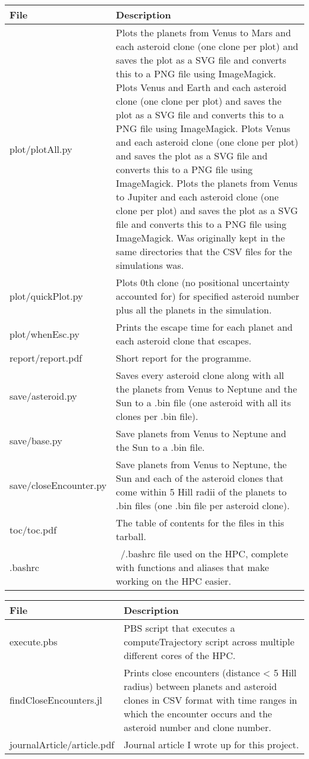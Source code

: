 \documentclass[12pt,a4paper]{article}
\begin{document}
\begin{tabular}{|m{15em}|m{30em}|}
    \hline
    File & Description \\\hline
    plot/plotAll.py & Plots the planets from Venus to Mars and each asteroid clone (one clone per plot) and saves the plot as a SVG file and converts this to a PNG file using ImageMagick. Plots Venus and Earth and each asteroid clone (one clone per plot) and saves the plot as a SVG file and converts this to a PNG file using ImageMagick. Plots Venus and each asteroid clone (one clone per plot) and saves the plot as a SVG file and converts this to a PNG file using ImageMagick. Plots the planets from Venus to Jupiter and each asteroid clone (one clone per plot) and saves the plot as a SVG file and converts this to a PNG file using ImageMagick. Was originally kept in the same directories that the CSV files for the simulations was.\\\hline
    plot/quickPlot.py & Plots 0th clone (no positional uncertainty accounted for) for specified asteroid number plus all the planets in the simulation.\\\hline
    plot/whenEsc.py & Prints the escape time for each planet and each asteroid clone that escapes. \\\hline
    report/report.pdf & Short report for the programme. \\\hline
    save/asteroid.py & Saves every asteroid clone along with all the planets from Venus to Neptune and the Sun to a .bin file (one asteroid with all its clones per .bin file). \\\hline
    save/base.py & Save planets from Venus to Neptune and the Sun to a .bin file. \\\hline
    save/closeEncounter.py & Save planets from Venus to Neptune, the Sun and each of the asteroid clones that come within 5 Hill radii of the planets to .bin files (one .bin file per asteroid clone). \\\hline
    toc/toc.pdf & The table of contents for the files in this tarball.\\\hline
    .bashrc & ~/.bashrc file used on the HPC, complete with functions and aliases that make working on the HPC easier. \\\hline
\end{tabular}

\begin{tabular}{|m{15em}|m{30em}|}
    \hline
    File & Description \\\hline
    execute.pbs & PBS script that executes a computeTrajectory script across multiple different cores of the HPC. \\\hline
    findCloseEncounters.jl & Prints close encounters (distance < 5 Hill radius) between planets and asteroid clones in CSV format with time ranges in which the encounter occurs and the asteroid number and clone number. \\\hline
    journalArticle/article.pdf & Journal article I wrote up for this project. \\\hline
\end{tabular}
\end{document}
